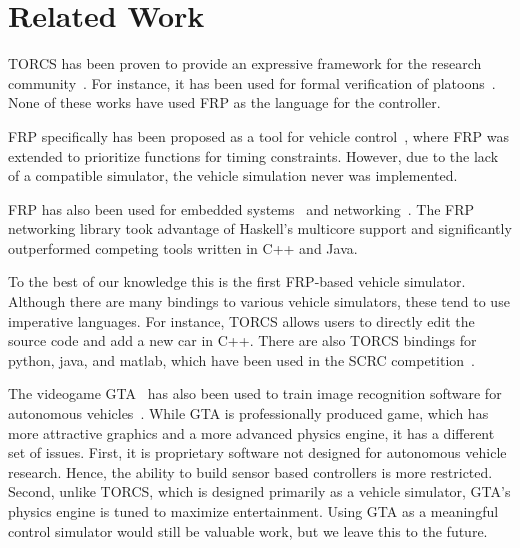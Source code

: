 \section{Related Work}

TORCS has been proven to provide an expressive framework for the research community~\cite{OnievaPAMP09,conf/cig/CardamoneLL09,conf/cig/MunozGS10}. 
For instance, it has been used for formal verification of platoons~\cite{kamali2016formal}. 
None of these works have used FRP as the language for the controller.


FRP specifically has been proposed as a tool for vehicle control~\cite{kazemi2016,zou2016}, where FRP was extended to prioritize functions for timing constraints. However, due to the lack of a compatible simulator, the vehicle simulation never was implemented. 

FRP has also been used for embedded systems~\cite{helbling2016juniper} and networking~\cite{voellmy2012scalable}.
The FRP networking library took advantage of Haskell's multicore support and significantly outperformed competing tools written in C++ and Java.


To the best of our knowledge this is the first FRP-based vehicle simulator.
Although there are many bindings to various vehicle simulators, these tend to use imperative languages.
For instance, TORCS allows users to directly edit the source code and add a new car in C++.
There are also TORCS bindings for python, java, and matlab, which have been used in the SCRC competition~\cite{SCRC}.

The videogame GTA~\cite{} has also been used to train image recognition software for autonomous vehicles~\cite{}.
While GTA is professionally produced game, which has more attractive graphics and a more advanced physics engine, it has a different set of issues.
First, it is proprietary software not designed for autonomous vehicle research. 
Hence, the ability to build sensor based controllers is more restricted. 
Second, unlike TORCS, which is designed primarily as a vehicle simulator, GTA's physics engine is tuned to maximize entertainment.
Using GTA as a meaningful control simulator would still be valuable work, but we leave this to the future.
